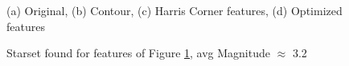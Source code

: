 \documentclass[paper=a4, fontsize=11pt]{scrartcl} %
\begin{document}
\begin{figure}[!h]
\caption{(a) Original, (b) Contour, (c) Harris Corner features, (d) Optimized features}
\label{mj}
\end{figure}

\begin{figure}[!h]
\caption{Starset found for features of Figure \ref{mj}, avg Magnitude $\approx$ 3.2}
\label{mjss}
\end{figure}
\end{document}
